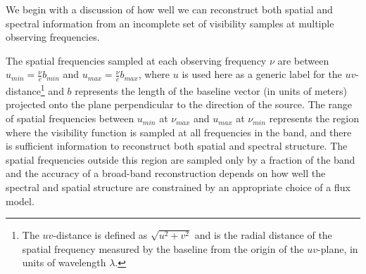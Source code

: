 \documentclass[structabstract]{stylefiles/aa}
\begin{document}
%
%


We begin with a discussion of how well we can reconstruct both spatial and 
spectral information from an incomplete set of visibility samples at
multiple observing frequencies.

The spatial frequencies sampled at each observing frequency $\nu$ are between  
${u}_{min} = \frac{\nu}{c}{b}_{min} $ and ${u}_{max} = \frac{\nu}{c}{b}_{max}$, 
where ${u}$ is used here as a generic label for the $uv$-distance\footnote
{
The $uv$-distance is defined as $\sqrt{u^2+v^2}$ and is the 
radial distance of the spatial frequency measured by the baseline from the
 origin of the $uv$-plane, in units of wavelength $\lambda$.
} and 
$b$ represents the length of the baseline vector (in units of meters) projected onto the plane
perpendicular to the direction of the source.
%
The range of spatial frequencies between ${u}_{min}$ at $\nu_{max}$ and
${u}_{max}$ at $\nu_{min}$ represents the region where the visibility function
is sampled at all frequencies in the band, and there is sufficient information
to reconstruct both spatial and spectral structure.
The spatial frequencies outside this region are sampled only by a fraction of the 
band and the accuracy of a broad-band reconstruction
depends on how well the spectral and spatial structure are
constrained by an appropriate choice of a flux model. %
\end{document}

